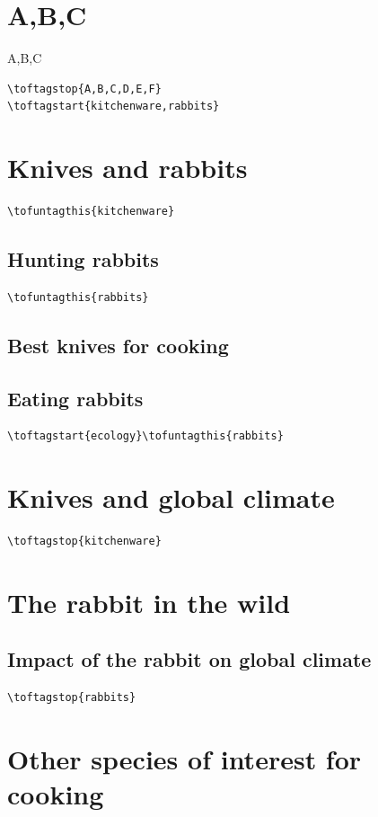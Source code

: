 \documentclass{article}
\begin{document}
\section{A,B,C}
A,B,C
\begin{verbatim}
\toftagstop{A,B,C,D,E,F}
\toftagstart{kitchenware,rabbits}
\end{verbatim}
\section{Knives and rabbits}
\begin{verbatim}
\tofuntagthis{kitchenware}
\end{verbatim}
\subsection{Hunting rabbits}
\begin{verbatim}
\tofuntagthis{rabbits}
\end{verbatim}
\subsection{Best knives for cooking}
\subsection{Eating rabbits}
\begin{verbatim}
\toftagstart{ecology}\tofuntagthis{rabbits}
\end{verbatim}
\section{Knives and global climate}
\begin{verbatim}
\toftagstop{kitchenware}
\end{verbatim}
\section{The rabbit in the wild}
\subsection{Impact of the rabbit on global climate}
\begin{verbatim}
\toftagstop{rabbits}
\end{verbatim}
\section{Other species of interest for cooking}
\end{document}
